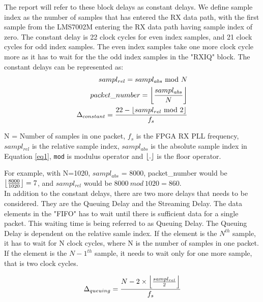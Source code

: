 The report will refer to these block delays as constant delays.
We define sample index as the number of samples that has entered the RX data path, with the first sample from the LMS7002M entering the RX data path having sample index of zero. 
The constant delay is 22 clock cycles for even index samples, and 21 clock cycles for odd index samples.
The even index samples take one more clock cycle more as it has to wait for the the odd index samples in the "RXIQ" block.
The constant delays can be represented as:\\

\begin{subequations} \label{eq1}
\begin{align}
	sampl_{rel} = sampl_{abs} \ \text{mod} \ N \label{eq1.1}\\ 
  packet\_number= \floor*{\frac{sampl_{abs}}{N}} \label{eq1.2}\\
  \Delta_{constant} = \frac{22 - \floor*{sampl_{rel} \ \text{mod} \ 2 }}{f_s} \label{eq1.3}
\end{align}
  
\end{subequations}

N = Number of samples in one packet, $f_s$ is the \ac{FPGA} RX PLL frequency, $sampl_{rel}$ is the relative sample index, $sampl_{abs}$ is the absolute sample index in Equation \ref{eq1}, \texttt{mod} is modulus operator and $\floor*{.}$ is the floor operator.

For example, with N=1020, $sampl_{abs}$ = 8000, packet\_number would be $\floor*{\frac{8000}{1020}} = 7$, and $sampl_{rel}$ would be  $8000 \ mod \ 1020 = 860$. \\
 
In addition to the constant delays, there are two more delays that needs to be considered.
They are the Queuing Delay and the Streaming Delay.
The data elements in the "FIFO" has to wait until there is sufficient data for a single packet.
This waiting time is being referred to as Queuing Delay.
The Queuing Delay is dependent on the relative samle index.
If the element is the $N^{th}$ sample, it has to wait for N clock cycles, where N is the number of samples in one packet.
If the element is the $N-1^{th}$ sample, it needs to wait only for one more sample, that is two clock cycles.

\begin{equation} \label{eq2}
\Delta_{queuing} = \frac{N - 2 \times \floor*{\frac{sampl_{rel}}{2}}}{f_s}
\end{equation}
 
